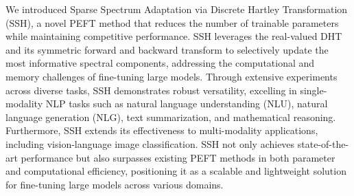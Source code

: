 We introduced Sparse Spectrum Adaptation via Discrete Hartley Transformation (SSH), a novel PEFT method that reduces the number of trainable parameters while maintaining competitive performance. SSH leverages the real-valued DHT and its symmetric forward and backward transform to selectively update the most informative spectral components, addressing the computational and memory challenges of fine-tuning large models. Through extensive experiments across diverse tasks, SSH demonstrates robust versatility, excelling in single-modality NLP tasks such as natural language understanding (NLU), natural language generation (NLG), text summarization, and mathematical reasoning. Furthermore, SSH extends its effectiveness to multi-modality applications, including vision-language image classification. SSH not only achieves state-of-the-art performance but also surpasses existing PEFT methods in both parameter and computational efficiency, positioning it as a scalable and lightweight solution for fine-tuning large models across various domains.








